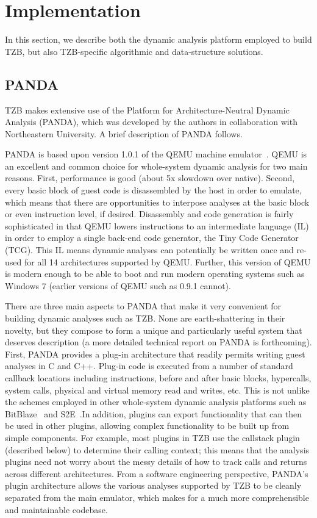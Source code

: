 \section{Implementation}
\label{sec:implementation}

In this section, we describe both the dynamic analysis platform employed to
build TZB, but also TZB-specific algorithmic and data-structure solutions.

\subsection{PANDA}
\label{sec:implementation:subsec:panda}

TZB makes extensive use of the Platform for Architecture-Neutral Dynamic
Analysis (PANDA), which was developed by the authors in collaboration
with Northeastern University. A brief description of PANDA follows.

PANDA is based upon version 1.0.1 of the QEMU machine
emulator~\cite{Bellard:2005}. QEMU is an excellent and common choice
for whole-system dynamic analysis for two main reasons. First,
performance is good (about 5x slowdown over native). Second, every basic
block of guest code is disassembled by the host in order to emulate,
which means that there are opportunities to interpose analyses at the
basic block or even instruction level, if desired. Disassembly and code
generation is fairly sophisticated in that QEMU lowers instructions to
an intermediate language (IL) in order to employ a single back-end code
generator, the Tiny Code Generator (TCG). This IL means dynamic
analyses can potentially be written once and re-used for all 14
architectures supported by QEMU. Further, this version of QEMU is modern
enough to be able to boot and run modern operating systems such as
Windows 7 (earlier versions of QEMU such as 0.9.1 cannot).

There are three main aspects to PANDA that make it very convenient for
building dynamic analyses such as TZB. None are earth-shattering in
their novelty, but they compose to form a unique and particularly useful
system that deserves description (a more detailed technical report on
PANDA is forthcoming). First, PANDA provides a plug-in architecture that
readily permits writing guest analyses in C and C++. Plug-in code is
executed from a number of standard callback locations including
instructions, before and after basic blocks, hypercalls, system calls,
physical and virtual memory read and writes, etc. This is not unlike the
schemes employed in other whole-system dynamic analysis platforms such
as BitBlaze~\cite{Song:2008bitblaze} and S2E~\cite{Chipounov:2011s2e}.In
addition, plugins can export functionality that can then be used in
other plugins, allowing complex functionality to be built up from simple
components. For example, most plugins in TZB use the callstack plugin
(described below) to determine their calling context; this means that
the analysis plugins need not worry about the messy details of how to
track calls and returns across different architectures. From a software
engineering perspective, PANDA's plugin architecture allows the various
analyses supported by TZB to be cleanly separated from the main
emulator, which makes for a much more comprehensible and maintainable
codebase.

